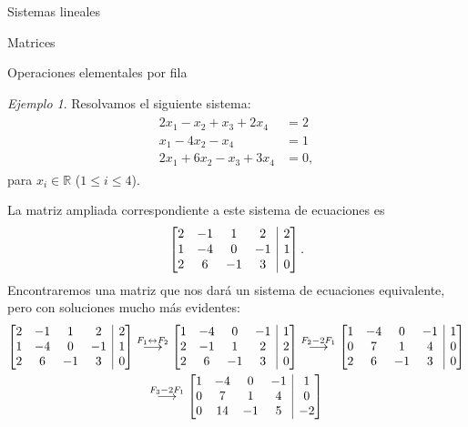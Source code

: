 \documentclass[a4paper,12pt,twoside,spanish,reqno]{amsbook}
\numberwithin{equation}{section}
\theoremstyle{definition}
\theoremstyle{remark}
\newtheorem*{ejemplo*}{Ejemplo}
\newcommand{\R}{\mathbb R}
\begin{document}
\begin{chapter}{Sistemas lineales}
\begin{section}{Matrices}
\begin{subsection}{Operaciones elementales por fila}
                \begin{ejemplo*}\label{ejemplo2.11}
                    Resolvamos el siguiente sistema:
                    \begin{align}\label{sist-eq-01}
                    \begin{split}
                    2x_1 - x_2 + x_3 + 2x_4 &= 2 \\
                    x_1 - 4x_2 -x_4 &=1 \\
                    2x_1 +6x_2 -x_3 +3x_4 &= 0,  
                    \end{split}
                    \end{align}
                    para  $x_i \in \R$ ($1 \le i \le 4$). 
                
                    
                    La matriz ampliada  correspondiente a este sistema de ecuaciones es 
                    $$
                    \left[\begin{array}{@{}*{4}{c}|c@{}} 
                     2& -1&1& 2&2 \\ 1&-4 &0&-1&1 \\ 2&6&-1&3&0 \end{array}\right].
                    $$
                    Encontraremos una matriz que nos dará un sistema de ecuaciones equivalente, pero con soluciones mucho más evidentes:
                    \begin{multline*}
                    \left[\begin{array}{@{}*{4}{c}|c@{}}  2& -1&1& 2&2 \\ 1&-4 &0&-1&1 \\ 2&6&-1&3&0 \end{array}\right]
                    \stackrel{F_1\leftrightarrow F_2}{\longrightarrow} 
                    \left[\begin{array}{@{}*{4}{c}|c@{}}  1&-4 &0&-1&1 \\ 2& -1&1& 2&2 \\ 2&6&-1&3&0 \end{array}\right]
                    \stackrel{F_2-2 F_1}{\longrightarrow} 
                    \left[\begin{array}{@{}*{4}{c}|c@{}}  1&-4 &0&-1&1 \\ 0& 7&1& 4&0 \\ 2&6&-1&3&0 \end{array}\right]
                    \\
                    \stackrel{F_3-2 F_1}{\longrightarrow} 
                    \left[\begin{array}{@{}*{4}{c}|c@{}}  1&-4 &0&-1&1 \\ 0& 7&1& 4&0 \\ 0&14&-1&5&-2 \end{array}\right] 

\end{multline*}
\end{ejemplo*}
\end{subsection}
\end{section}
\end{chapter}
\end{document}
